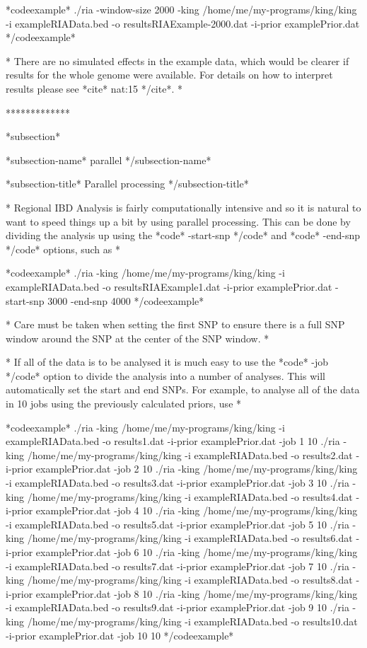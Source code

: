 *codeexample*
./ria -window-size 2000 -king /home/me/my-programs/king/king -i exampleRIAData.bed -o resultsRIAExample-2000.dat -i-prior examplePrior.dat
*/codeexample*

*
There are no simulated effects in the example data, which would be clearer if results for the whole genome were available. For details on how to interpret results please see *cite* nat:15 */cite*.
*

*************

*subsection*

*subsection-name* parallel */subsection-name*

*subsection-title* Parallel processing */subsection-title*

*
Regional IBD Analysis is fairly computationally intensive and so it is natural to want to speed things up a bit by using parallel processing. This can be done by dividing the analysis up using the *code* -start-snp */code* and *code* -end-snp */code* options, such as
*


*codeexample*
./ria -king /home/me/my-programs/king/king -i exampleRIAData.bed -o resultsRIAExample1.dat -i-prior examplePrior.dat -start-snp 3000 -end-snp 4000
*/codeexample*

*
Care must be taken when setting the first SNP to ensure there is a full SNP window around the SNP at the center of the SNP window.
*

*
If all of the data is to be analysed it is much easy to use the *code* -job */code* option to divide the analysis into a number of analyses. This will automatically set the start and end SNPs. For example, to analyse all of the data in 10 jobs using the previously calculated priors, use
*

*codeexample*
./ria -king /home/me/my-programs/king/king -i exampleRIAData.bed -o results1.dat -i-prior examplePrior.dat -job 1 10
./ria -king /home/me/my-programs/king/king -i exampleRIAData.bed -o results2.dat -i-prior examplePrior.dat -job 2 10
./ria -king /home/me/my-programs/king/king -i exampleRIAData.bed -o results3.dat -i-prior examplePrior.dat -job 3 10
./ria -king /home/me/my-programs/king/king -i exampleRIAData.bed -o results4.dat -i-prior examplePrior.dat -job 4 10
./ria -king /home/me/my-programs/king/king -i exampleRIAData.bed -o results5.dat -i-prior examplePrior.dat -job 5 10
./ria -king /home/me/my-programs/king/king -i exampleRIAData.bed -o results6.dat -i-prior examplePrior.dat -job 6 10
./ria -king /home/me/my-programs/king/king -i exampleRIAData.bed -o results7.dat -i-prior examplePrior.dat -job 7 10
./ria -king /home/me/my-programs/king/king -i exampleRIAData.bed -o results8.dat -i-prior examplePrior.dat -job 8 10
./ria -king /home/me/my-programs/king/king -i exampleRIAData.bed -o results9.dat -i-prior examplePrior.dat -job 9 10
./ria -king /home/me/my-programs/king/king -i exampleRIAData.bed -o results10.dat -i-prior examplePrior.dat -job 10 10
*/codeexample*

